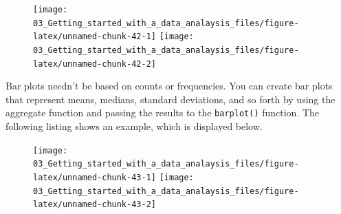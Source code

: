 \documentclass[
]{book}
\newenvironment{Shaded}{\begin{snugshade}}{\end{snugshade}}
\newcommand{\AttributeTok}[1]{\textcolor[rgb]{0.77,0.63,0.00}{#1}}
\newcommand{\CommentTok}[1]{\textcolor[rgb]{0.56,0.35,0.01}{\textit{#1}}}
\newcommand{\DecValTok}[1]{\textcolor[rgb]{0.00,0.00,0.81}{#1}}
\newcommand{\FloatTok}[1]{\textcolor[rgb]{0.00,0.00,0.81}{#1}}
\newcommand{\FunctionTok}[1]{\textcolor[rgb]{0.00,0.00,0.00}{#1}}
\newcommand{\NormalTok}[1]{#1}
\newcommand{\OtherTok}[1]{\textcolor[rgb]{0.56,0.35,0.01}{#1}}
\newcommand{\SpecialCharTok}[1]{\textcolor[rgb]{0.00,0.00,0.00}{#1}}
\newcommand{\StringTok}[1]{\textcolor[rgb]{0.31,0.60,0.02}{#1}}
\begin{document}
\begin{figure}
\texttt{[image: 03\_Getting\_started\_with\_a\_data\_analaysis\_files/figure-latex/unnamed-chunk-42-1]} \texttt{[image: 03\_Getting\_started\_with\_a\_data\_analaysis\_files/figure-latex/unnamed-chunk-42-2]} \end{figure}

Bar plots needn't be based on counts or frequencies. You can create bar plots that represent means, medians, standard deviations, and so forth by using the aggregate function and passing the results to the \texttt{barplot()} function. The following listing shows an example, which is displayed below.

\begin{Shaded}
\end{Shaded}

\begin{figure}
\texttt{[image: 03\_Getting\_started\_with\_a\_data\_analaysis\_files/figure-latex/unnamed-chunk-43-1]} \texttt{[image: 03\_Getting\_started\_with\_a\_data\_analaysis\_files/figure-latex/unnamed-chunk-43-2]} \end{figure}
\end{document}
